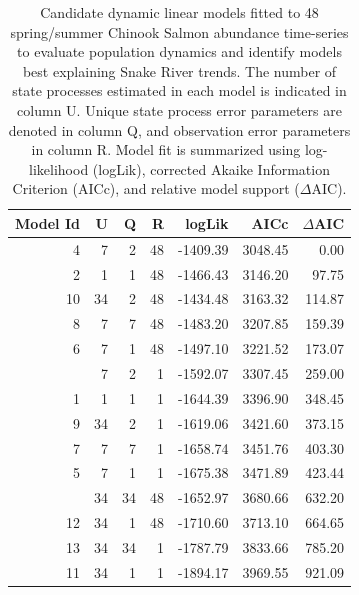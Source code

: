 \documentclass[10pt,a4paper]{article}
\begin{document}
\begin{table}

\caption{Candidate dynamic linear models fitted to 48 spring/summer Chinook Salmon abundance time-series to evaluate population dynamics and identify models best explaining Snake River trends. The number of state processes estimated in each model is indicated in column U. Unique state process error parameters are denoted in column Q, and observation error parameters in column R. Model fit is summarized using log-likelihood (logLik), corrected Akaike Information Criterion (AICc), and relative model support ($\Delta$AIC).}
\centering
\begin{tabular}[t]{rrrrrrr}
\toprule
Model Id & U & Q & R & logLik & AICc & $\Delta$AIC\\
\midrule
4 & 7 & 2 & 48 & -1409.39 & 3048.45 & 0.00\\
2 & 1 & 1 & 48 & -1466.43 & 3146.20 & 97.75\\
10 & 34 & 2 & 48 & -1434.48 & 3163.32 & 114.87\\
8 & 7 & 7 & 48 & -1483.20 & 3207.85 & 159.39\\
6 & 7 & 1 & 48 & -1497.10 & 3221.52 & 173.07\\
\addlinespace
3 & 7 & 2 & 1 & -1592.07 & 3307.45 & 259.00\\
1 & 1 & 1 & 1 & -1644.39 & 3396.90 & 348.45\\
9 & 34 & 2 & 1 & -1619.06 & 3421.60 & 373.15\\
7 & 7 & 7 & 1 & -1658.74 & 3451.76 & 403.30\\
5 & 7 & 1 & 1 & -1675.38 & 3471.89 & 423.44\\
\addlinespace
14 & 34 & 34 & 48 & -1652.97 & 3680.66 & 632.20\\
12 & 34 & 1 & 48 & -1710.60 & 3713.10 & 664.65\\
13 & 34 & 34 & 1 & -1787.79 & 3833.66 & 785.20\\
11 & 34 & 1 & 1 & -1894.17 & 3969.55 & 921.09\\
\bottomrule
\end{tabular}
\end{table}
\end{document}

